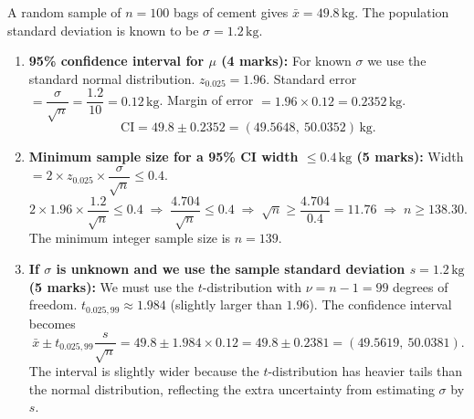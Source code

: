 \documentclass[11pt]{article}
\begin{document}
\begin{corrige}
A random sample of \(n=100\) bags of cement gives \(\bar{x}=49.8\,\mathrm{kg}\). The population standard deviation is known to be \(\sigma=1.2\,\mathrm{kg}\).

\begin{enumerate}
\item \textbf{95\% confidence interval for \(\mu\) (4 marks):}
For known \(\sigma\) we use the standard normal distribution. \(z_{0.025} = 1.96\).
Standard error \(= \dfrac{\sigma}{\sqrt{n}} = \dfrac{1.2}{10} = 0.12\,\mathrm{kg}\).
Margin of error \(= 1.96 \times 0.12 = 0.2352\,\mathrm{kg}\).
\[
\text{CI} = 49.8 \pm 0.2352 = (49.5648,\ 50.0352)\,\mathrm{kg}.
\]

\item \textbf{Minimum sample size for a 95\% CI width \(\le 0.4\,\mathrm{kg}\) (5 marks):}
Width \(= 2 \times z_{0.025} \times \dfrac{\sigma}{\sqrt{n}} \le 0.4\).
\[
2 \times 1.96 \times \frac{1.2}{\sqrt{n}} \le 0.4
\;\Rightarrow\; \frac{4.704}{\sqrt{n}} \le 0.4
\;\Rightarrow\; \sqrt{n} \ge \frac{4.704}{0.4} = 11.76
\;\Rightarrow\; n \ge 138.30.
\]
The minimum integer sample size is \(n = 139\).

\item \textbf{If \(\sigma\) is unknown and we use the sample standard deviation \(s=1.2\,\mathrm{kg}\) (5 marks):}
We must use the \(t\)-distribution with \(\nu = n-1 = 99\) degrees of freedom.
\(t_{0.025,99} \approx 1.984\) (slightly larger than \(1.96\)).
The confidence interval becomes
\[
\bar{x} \pm t_{0.025,99} \frac{s}{\sqrt{n}} = 49.8 \pm 1.984 \times 0.12 = 49.8 \pm 0.2381 = (49.5619,\ 50.0381).
\]
The interval is slightly wider because the \(t\)-distribution has heavier tails than the normal distribution, reflecting the extra uncertainty from estimating \(\sigma\) by \(s\).
\end{enumerate}
\end{corrige}
\end{document}
